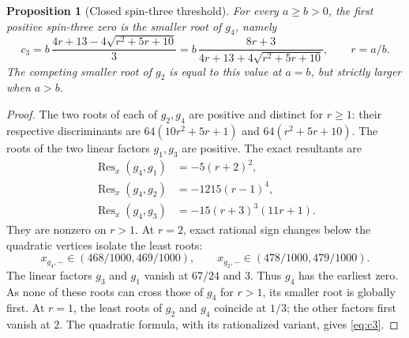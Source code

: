\documentclass[11pt,a4paper]{article}
\newtheorem{proposition}[theorem]{Proposition}
\begin{document}
\begin{proposition}[Closed spin-three threshold]\label{prop:spin3}
For every $a\geq b>0$, the first positive spin-three zero is
the smaller root of $g_4$, namely
\begin{equation}\label{eq:c3}
\boxed{c_3=b\,\frac{4r+13-4\sqrt{r^2+5r+10}}{3}
 =b\,\frac{8r+3}{4r+13+4\sqrt{r^2+5r+10}}},
\qquad r=a/b.
\end{equation}
The competing smaller root of $g_2$ is equal to this value
at $a=b$, but strictly larger when $a>b$.
\end{proposition}
\begin{proof}
The two roots of each of $g_2,g_4$ are positive and distinct
for $r\geq1$: their respective discriminants are
$64(10r^2+5r+1)$ and $64(r^2+5r+10)$.
The roots of the two linear factors $g_1,g_3$ are positive.
The exact resultants are
\begin{align}
\operatorname{Res}_x(g_4,g_1)&=-5(r+2)^2,\nonumber\\
\operatorname{Res}_x(g_4,g_2)&=-1215(r-1)^4,\label{eq:res3}\\
\operatorname{Res}_x(g_4,g_3)&=-15(r+3)^3(11r+1).\nonumber
\end{align}
They are nonzero on $r>1$. At $r=2$, exact rational sign
changes below the quadratic vertices isolate the least roots:
\[
x_{g_4,-}\in(468/1000,469/1000),\qquad
x_{g_2,-}\in(478/1000,479/1000).
\]
The linear factors $g_3$ and $g_1$ vanish at $67/24$ and $3$.
Thus $g_4$ has the earliest zero. As none of these roots can
cross those of $g_4$ for $r>1$,
its smaller root is globally first. At $r=1$, the least roots
of $g_2$ and $g_4$ coincide at $1/3$; the other factors first
vanish at $2$. The quadratic formula, with its rationalized
variant, gives \eqref{eq:c3}.
\end{proof}
\end{document}
